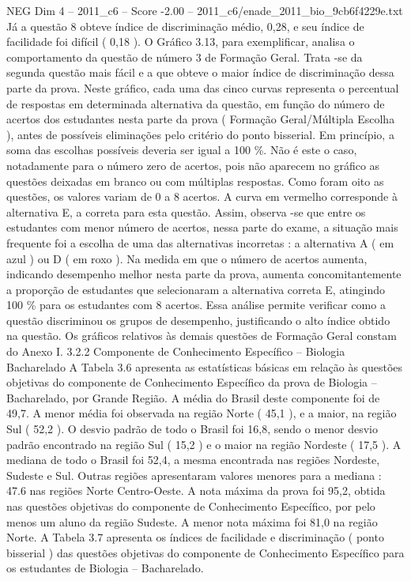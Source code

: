 \begin{textsample}{NEG Dim 4 – 2011\_c6 – Score -2.00 – 2011\_c6/enade\_2011\_bio\_9cb6f4229e.txt}
Já a questão 8 obteve índice de discriminação médio, 0,28, e seu índice de facilidade foi difícil ( 0,18 ).
O Gráfico 3.13, para exemplificar, analisa o comportamento da questão de número 3 de Formação Geral.
Trata -se da segunda questão mais fácil e a que obteve o maior índice de discriminação dessa parte da prova.
Neste gráfico, cada uma das cinco curvas representa o percentual de respostas em determinada alternativa da questão, em função do número de acertos dos estudantes nesta parte da prova ( Formação Geral/Múltipla Escolha ), antes de possíveis eliminações pelo critério do ponto bisserial.
Em princípio, a soma das escolhas possíveis deveria ser igual a 100 \%.
Não é este o caso, notadamente para o número zero de acertos, pois não aparecem no gráfico as questões deixadas em branco ou com múltiplas respostas.
Como foram oito as questões, os valores variam de 0 a 8 acertos.
A curva em vermelho corresponde à alternativa E, a correta para esta questão.
Assim, observa -se que entre os estudantes com menor número de acertos, nessa parte do exame, a situação mais frequente foi a escolha de uma das alternativas incorretas : a alternativa A ( em azul ) ou D ( em roxo ).
Na medida em que o número de acertos aumenta, indicando desempenho melhor nesta parte da prova, aumenta concomitantemente a proporção de estudantes que selecionaram a alternativa correta E, atingindo 100 \% para os estudantes com 8 acertos.
Essa análise permite verificar como a questão discriminou os grupos de desempenho, justificando o alto índice obtido na questão.
Os gráficos relativos às demais questões de Formação Geral constam do Anexo I. 3.2.2 Componente de Conhecimento Específico – Biologia Bacharelado A Tabela 3.6 apresenta as estatísticas básicas em relação às questões objetivas do componente de Conhecimento Específico da prova de Biologia – Bacharelado, por Grande Região.
A média do Brasil deste componente foi de 49,7.
A menor média foi observada na região Norte ( 45,1 ), e a maior, na região Sul ( 52,2 ).
O desvio padrão de todo o Brasil foi 16,8, sendo o menor desvio padrão encontrado na região Sul ( 15,2 ) e o maior na região Nordeste ( 17,5 ).
A mediana de todo o Brasil foi 52,4, a mesma encontrada nas regiões Nordeste, Sudeste e Sul.
Outras regiões apresentaram valores menores para a mediana : 47.6 nas regiões Norte Centro-Oeste.
A nota máxima da prova foi 95,2, obtida nas questões objetivas do componente de Conhecimento Específico, por pelo menos um aluno da região Sudeste.
A menor nota máxima foi 81,0 na região Norte.
A Tabela 3.7 apresenta os índices de facilidade e discriminação ( ponto bisserial ) das questões objetivas do componente de Conhecimento Específico para os estudantes de Biologia – Bacharelado.

\end{textsample}

